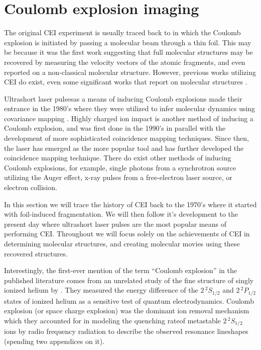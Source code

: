 \section{Coulomb explosion imaging}
The original CEI experiment is usually traced back to \citet{Vager89} in which the Coulomb explosion is initiated by passing a molecular beam through a thin foil. This may be because it was the first work suggesting that full molecular structures may be recovered by measuring the velocity vectors of the atomic fragments, and even reported on a non-classical molecular structure. However, previous works utilizing CEI do exist, even some significant works that report on molecular structures \citep{Kanter79}.

Ultrashort laser pulses\footnotemark as a means of inducing Coulomb explosions made their entrance in the 1980's where they were utilized to infer molecular dynamics using covariance mapping \citep{Frasinski89}. Highly charged ion impact is another method of inducing a Coulomb explosion, and was first done in the 1990's in parallel with the development of more sophisticated coincidence mapping techniques. Since then, the laser has emerged as the more popular tool and has further developed the coincidence mapping technique. There do exist other methods of inducing Coulomb explosions, for example, single photons from a synchrotron source utilizing the Auger effect, x-ray pulses from a free-electron laser source, or electron collision.


In this section we will trace the history of CEI back to the 1970's where it started with foil-induced fragmentation. We will then follow it's development to the present day where ultrashort laser pulses are the most popular means of performing CEI. Throughout we will focus solely on the achievements of CEI in determining molecular structures, and creating molecular movies using these recovered structures.\footnotemark


Interestingly, the first-ever mention of the term ``Coulomb explosion'' in the published literature comes from an unrelated study of the fine structure of singly ionized helium by \citet{Novick55}. They measured the energy difference of the $2 \, ^2 S_{1/2}$ and $2 \, ^2 P_{1/2}$ states of ionized helium as a sensitive test of quantum electrodynamics. Coulomb explosion (or space charge explosion) was the dominant ion removal mechanism which they accounted for in modeling the quenching rate\footnotemark of metastable $2 \, ^2 S_{1/2}$ ions by radio frequency radiation to describe the observed resonance lineshapes (spending two appendices on it).

